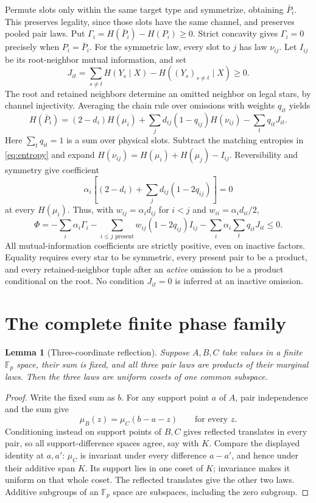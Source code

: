 \documentclass[11pt]{article}
\newtheorem{lemma}{Lemma}
\newcommand{\Fp}{\mathbb F_p}
\begin{document}
Permute slots only within the same target type and symmetrize, obtaining $\bar P_i$. This preserves legality, since those slots have the same channel, and preserves pooled pair laws. Put $\Gamma_i=H(\bar P_i)-H(P_i)\ge0$. Strict concavity gives $\Gamma_i=0$ precisely when $P_i=\bar P_i$. For the symmetric law, every slot to $j$ has law $\nu_{ij}$. Let $I_{ij}$ be its root-neighbor mutual information, and set
\[
 J_{it}=\sum_{s\ne t}H(Y_s\mid X)-H((Y_s)_{s\ne t}\mid X)\ge0.
\]
The root and retained neighbors determine an omitted neighbor on legal stars, by channel injectivity. Averaging the chain rule over omissions with weights $q_{it}$ yields
\begin{equation}\label{eq:localentropy}
 H(\bar P_i)=(2-d_i)H(\mu_i)
 +\sum_jd_{ij}(1-q_{ij})H(\nu_{ij})-\sum_tq_{it}J_{it}.
\end{equation}
Here $\sum_tq_{it}=1$ is a sum over physical slots. Subtract the matching entropies in \eqref{eq:entropy} and expand $H(\nu_{ij})=H(\mu_i)+H(\mu_j)-I_{ij}$. Reversibility and symmetry give coefficient
\[
 \alpha_i\left[(2-d_i)+\sum_jd_{ij}(1-2q_{ij})\right]=0
\]
at every $H(\mu_i)$. Thus, with $w_{ij}=\alpha_id_{ij}$ for $i<j$ and $w_{ii}=\alpha_id_{ii}/2$,
\begin{equation}\label{eq:identity}
 \Phi=-\sum_i\alpha_i\Gamma_i
 -\sum_{i\le j\text{ present}}w_{ij}(1-2q_{ij})I_{ij}
 -\sum_i\alpha_i\sum_tq_{it}J_{it}\le0.
\end{equation}
All mutual-information coefficients are strictly positive, even on inactive factors. Equality requires every star to be symmetric, every present pair to be a product, and every retained-neighbor tuple after an \emph{active} omission to be a product conditional on the root. No condition $J_{it}=0$ is inferred at an inactive omission.

\section{The complete finite phase family}
\begin{lemma}[Three-coordinate reflection]\label{lem:triple}
Suppose $A,B,C$ take values in a finite $\Fp$ space, their sum is fixed, and all three pair laws are products of their marginal laws. Then the three laws are uniform cosets of one common subspace.
\end{lemma}
\begin{proof}
Write the fixed sum as $b$. For any support point $a$ of $A$, pair independence and the sum give
\[
 \mu_B(z)=\mu_C(b-a-z)\qquad\text{for every }z.
\]
Conditioning instead on support points of $B,C$ gives reflected translates in every pair, so all support-difference spaces agree, say with $K$. Compare the displayed identity at $a,a'$: $\mu_C$ is invariant under every difference $a-a'$, and hence under their additive span $K$. Its support lies in one coset of $K$; invariance makes it uniform on that whole coset. The reflected translates give the other two laws. Additive subgroups of an $\Fp$ space are subspaces, including the zero subgroup.
\end{proof}
\end{document}
